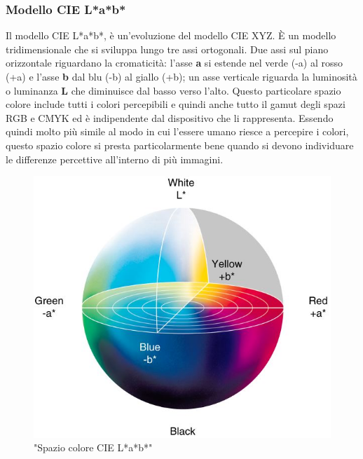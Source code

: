 \documentclass[a4paper,11pt]{article}
\begin{document}
        
    
        \newpage

        \subsubsection{Modello CIE L*a*b*}
        Il modello CIE L*a*b*, è un'evoluzione del modello CIE XYZ. È un modello tridimensionale che si sviluppa lungo tre assi ortogonali. Due assi sul piano orizzontale riguardano la cromaticità: l'asse \textbf{a} si estende nel verde (-a) al rosso (+a)
        e l'asse \textbf{b} dal blu (-b) al giallo (+b); un asse verticale riguarda la luminosità o luminanza \textbf{L} che diminuisce dal basso verso l'alto.
        Questo particolare spazio colore include tutti i colori percepibili e quindi anche tutto il gamut degli spazi RGB e CMYK ed è indipendente dal dispositivo che li rappresenta.
        Essendo quindi molto più simile al modo in cui l'essere umano riesce a percepire i colori, questo spazio colore si presta particolarmente bene quando si devono individuare le differenze percettive all'interno di più immagini.

    
        \begin{figure}[h]
            \centering
            \includegraphics[scale=0.6]{CIELAB.jpg}
            \caption{"Spazio colore CIE L*a*b*"}
        \end{figure}

    \newpage
\end{document}

